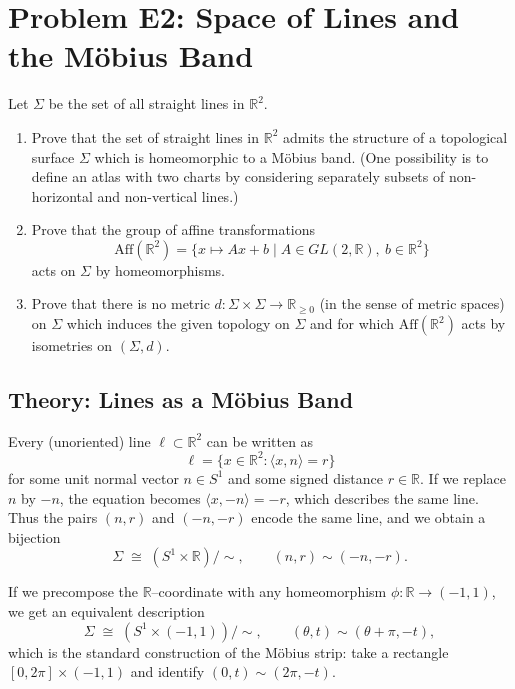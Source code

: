 \documentclass[12pt,a4paper]{article}
\theoremstyle{plain}
\theoremstyle{definition}      %
\begin{document}
	
	\section*{Problem E2: Space of Lines and the M\"obius Band}
	
	Let $\Sigma$ be the set of all straight lines in $\mathbb{R}^2$.
	
	\begin{enumerate}
		\item[(a)] Prove that the set of straight lines in $\mathbb{R}^2$ admits the structure
		of a topological surface $\Sigma$ which is homeomorphic to a M\"obius band.
		(One possibility is to define an atlas with two charts by considering separately
		subsets of non-horizontal and non-vertical lines.)
		
		\item[(b)] Prove that the group of affine transformations
		\[
		\mathrm{Aff}(\mathbb{R}^2)
		= \{x \mapsto Ax + b \mid A \in GL(2,\mathbb{R}),\ b \in \mathbb{R}^2\}
		\]
		acts on $\Sigma$ by homeomorphisms.
		
		\item[(c)] Prove that there is no metric $d : \Sigma \times \Sigma \to \mathbb{R}_{\ge 0}$
		(in the sense of metric spaces) on $\Sigma$ which induces the given topology on $\Sigma$
		and for which $\mathrm{Aff}(\mathbb{R}^2)$ acts by isometries on $(\Sigma,d)$.
	\end{enumerate}
	
	\subsection*{Theory: Lines as a M\"obius Band}
	
	Every (unoriented) line $\ell \subset \mathbb{R}^2$ can be written as
	\[
	\ell = \{ x \in \mathbb{R}^2 : \langle x,n\rangle = r \}
	\]
	for some unit normal vector $n \in S^1$ and some signed distance $r \in \mathbb{R}$.
	If we replace $n$ by $-n$, the equation becomes
	$\langle x,-n\rangle = -r$, which describes the same line.  Thus the pairs
	$(n,r)$ and $(-n,-r)$ encode the same line, and we obtain a bijection
	\[
	\Sigma \;\cong\; (S^1\times\mathbb{R})/\!\sim,
	\qquad
	(n,r)\sim(-n,-r).
	\]
	
	If we precompose the $\mathbb{R}$--coordinate with any homeomorphism
	$\phi:\mathbb{R}\to(-1,1)$, we get an equivalent description
	\[
	\Sigma \;\cong\; (S^1\times(-1,1))/\!\sim,
	\qquad
	(\theta,t)\sim(\theta+\pi,-t),
	\]
	which is the standard construction of the M\"obius strip:
	take a rectangle $[0,2\pi]\times(-1,1)$ and identify $(0,t)\sim(2\pi,-t)$.
	
\end{document}
